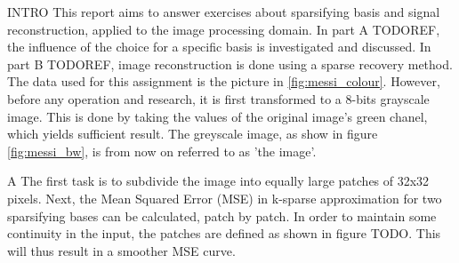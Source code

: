INTRO
This report aims to answer exercises about sparsifying basis and signal reconstruction, applied to the image processing domain. In part A TODOREF, the influence of the choice for a specific basis is investigated and discussed. In part B TODOREF, image reconstruction is done using a sparse recovery method.
The data used for this assignment is the picture in \ref{fig:messi_colour}. However, before any operation and research, it is first transformed to a 8-bits grayscale image. This is done by taking the values of the original image's green chanel, which yields sufficient result. The greyscale image, as show in figure \ref{fig:messi_bw}, is from now on referred to as 'the image'.

A
The first task is to subdivide the image into equally large patches of 32x32 pixels. Next, the Mean Squared Error (MSE) in k-sparse approximation for two sparsifying bases can be calculated, patch by patch. In order to maintain some continuity in the input, the patches are defined as shown in figure TODO. This will thus result in a smoother MSE curve.
